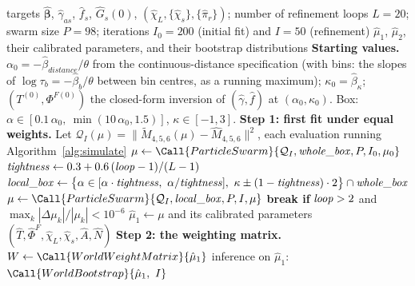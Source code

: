 \begin{algorithm}[H]
\caption{SMM estimation of $\mu=(\alpha,\kappa)$}
\label{alg:smm}
\small
\begin{algorithmic}[1]
\Require targets $\hat{\boldsymbol\beta}$, $\hat\gamma_{as}$, $\hat f_s$, $\hat{G}_s(0)$, $(\hat\chi_L,\{\hat\chi_s\},\{\hat\pi_r\})$; number of refinement loops $L=20$; swarm size $P=98$; iterations $I_0=200$ (initial fit) and $I=50$ (refinement)
\Ensure $\hat{\mu}_1$, $\hat{\mu}_2$, their calibrated parameters, and their bootstrap distributions
\vspace{2pt}
\State \textbf{Starting values.} $\alpha_0=-\hat\beta_{distance}/\theta$ from the continuous-distance specification (with bins: the slopes of $\log\tau_b=-\hat\beta_b/\theta$ between bin centres, as a running maximum); $\kappa_0=\hat\beta_\kappa$; $(T^{(0)},\Phi^{F(0)})$ the closed-form inversion of $(\hat\gamma,\hat f)$ at $(\alpha_0,\kappa_0)$. Box: $\alpha\in[0.1\,\alpha_0,\ \min(10\,\alpha_0,1.5)]$, $\kappa\in[-1,3]$.
\vspace{3pt}
\State \textbf{Step 1: first fit under equal weights.} Let
  $\mathcal{Q}_I(\mu)=\bigl\|\tilde{M}_{4,5,6}(\mu)-\hat{M}_{4,5,6}\bigr\|^2$, each evaluation running Algorithm~\ref{alg:simulate}
\State \quad $\mu\gets\Call{ParticleSwarm}{\mathcal{Q}_I,\var{whole\_box},P,I_0,\mu_0}$
    \State $\mathit{tightness}\gets 0.3+0.6\,(\mathit{loop}-1)/(L-1)$
    \State $\var{local\_box}\gets\bigl\{\alpha\in[\alpha\cdot\var{tightness},\ \alpha/\var{tightness}],\ \kappa\pm(1-\var{tightness})\cdot 2\bigr\}\cap\var{whole\_box}$
    \State $\mu\gets\Call{ParticleSwarm}{\mathcal{Q}_I,\var{local\_box},P,I,\mu}$
    \State \textbf{break if} $\mathit{loop}>2$ and $\max_k|\Delta\mu_k|/|\mu_k|<10^{-6}$
\EndFor
\State $\hat{\mu}_1\gets\mu$ and its calibrated parameters $(\hat T,\hat\Phi^F,\hat\chi_L,\hat\chi_s,\hat A,\hat N)$
\vspace{3pt}
\State \textbf{Step 2: the weighting matrix.} $W\gets\Call{WorldWeightMatrix}{\hat\mu_1}$ 
\State \quad inference on $\hat\mu_1$: $\Call{WorldBootstrap}{\hat\mu_1,\ I}$ 

\end{algorithmic}
\end{algorithm}
